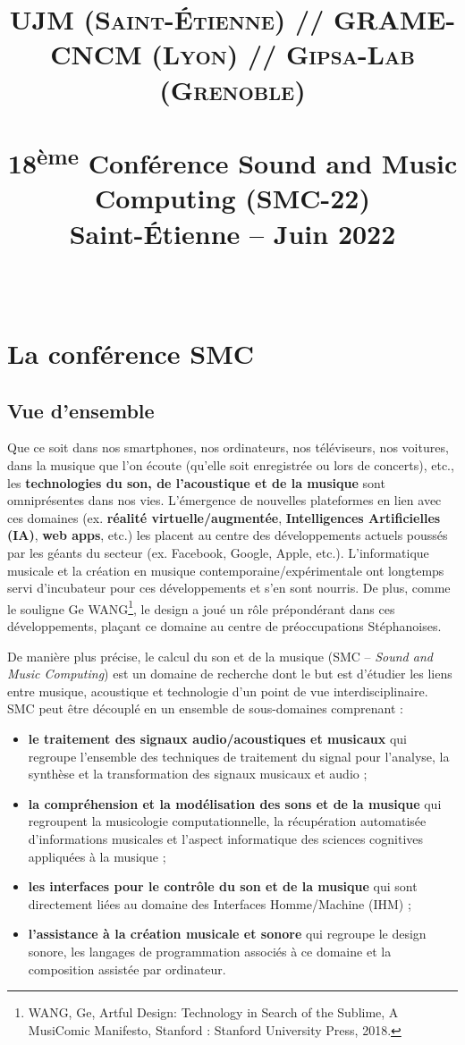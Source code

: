 \documentclass[fontsize=12pt]{scrartcl} %
\title{	
\normalfont \normalsize 
\textsc{UJM (Saint-Étienne) // GRAME-CNCM (Lyon) // Gipsa-Lab (Grenoble)} \\ [25pt] %
\horrule{0.5pt} \\[0.4cm] %
\huge 18\textsuperscript{ème} Conférence Sound and Music Computing (SMC-22)\\ Saint-Étienne -- Juin 2022 \\ %
\horrule{2pt} \\[0.5cm] %
}
\date{} %
\numberwithin{equation}{section} %
\numberwithin{figure}{section} %
\numberwithin{table}{section} %
\begin{document}
\maketitle %

\tableofcontents  

\section{La conférence SMC}

\subsection{Vue d'ensemble}

Que ce soit dans nos smartphones, nos ordinateurs, nos téléviseurs, nos voitures, dans la musique que l’on écoute (qu’elle soit enregistrée ou lors de concerts), etc., les \textbf{technologies du son, de l’acoustique et de la musique} sont omniprésentes dans nos vies. L’émergence de nouvelles plateformes en lien avec ces domaines (ex. \textbf{réalité virtuelle/augmentée}, \textbf{Intelligences Artificielles (IA)}, \textbf{web apps}, etc.) les placent au centre des développements actuels poussés par les géants du secteur (ex. Facebook, Google, Apple, etc.). L’informatique musicale et la création en musique contemporaine/expérimentale ont longtemps servi d’incubateur pour ces développements et s’en sont nourris. De plus, comme le souligne Ge WANG\footnote{WANG, Ge, Artful Design: Technology in Search of the Sublime, A MusiComic Manifesto, Stanford : Stanford University Press, 2018.}, le design a joué un rôle prépondérant dans ces développements, plaçant ce domaine au centre de préoccupations Stéphanoises. 

De manière plus précise, le calcul du son et de la musique (SMC -- \textit{Sound and Music Computing}) est un domaine de recherche dont le but est d'étudier les liens entre musique, acoustique et technologie d'un point de vue interdisciplinaire. SMC peut être découplé en un ensemble de sous-domaines comprenant :

\begin{itemize}
  \item \textbf{le traitement des signaux audio/acoustiques et musicaux} qui regroupe l'ensemble des techniques de traitement du signal pour l'analyse, la synthèse et la transformation des signaux musicaux et audio ;
  \item \textbf{la compréhension et la modélisation des sons et de la musique} qui regroupent la musicologie computationnelle, la récupération automatisée d'informations musicales et l'aspect informatique des sciences cognitives appliquées à la musique ;
  \item \textbf{les interfaces pour le contrôle du son et de la musique} qui sont directement liées au domaine des Interfaces Homme/Machine (IHM) ;
  \item \textbf{l'assistance à la création musicale et sonore} qui regroupe le design sonore, les langages de programmation associés à ce domaine et la composition assistée par ordinateur.
\end{itemize}
\end{document}
